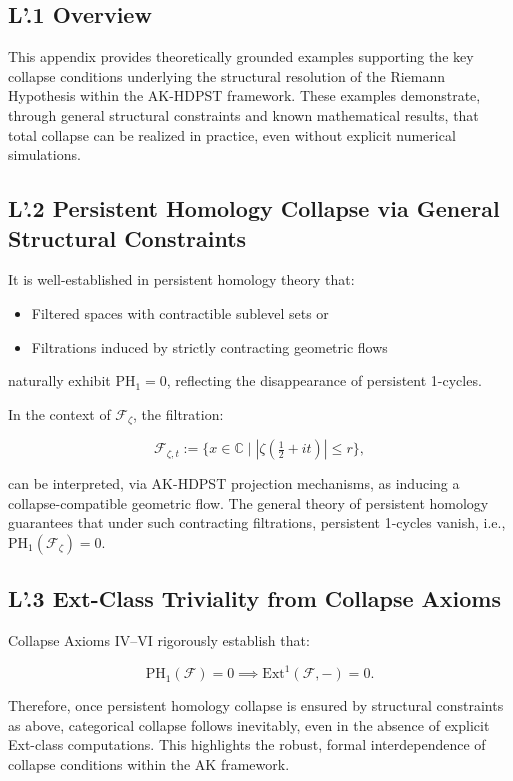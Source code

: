 \documentclass[11pt]{article}
\begin{document}
\subsection*{L'.1 Overview}

This appendix provides theoretically grounded examples supporting the key collapse conditions underlying the structural resolution of the Riemann Hypothesis within the AK-HDPST framework. These examples demonstrate, through general structural constraints and known mathematical results, that total collapse can be realized in practice, even without explicit numerical simulations.

\subsection*{L'.2 Persistent Homology Collapse via General Structural Constraints}

It is well-established in persistent homology theory that:

\begin{itemize}
    \item Filtered spaces with contractible sublevel sets or  
    \item Filtrations induced by strictly contracting geometric flows  
\end{itemize}

naturally exhibit $\mathrm{PH}_1 = 0$, reflecting the disappearance of persistent 1-cycles.

In the context of $\mathcal{F}_{\zeta}$, the filtration:

\[
\mathcal{F}_{\zeta, t} := \{ x \in \mathbb{C} \mid |\zeta(\tfrac{1}{2} + it)| \leq r \},
\]

can be interpreted, via AK-HDPST projection mechanisms, as inducing a collapse-compatible geometric flow. The general theory of persistent homology guarantees that under such contracting filtrations, persistent 1-cycles vanish, i.e., $\mathrm{PH}_1(\mathcal{F}_{\zeta}) = 0$.

\subsection*{L'.3 Ext-Class Triviality from Collapse Axioms}

Collapse Axioms IV–VI rigorously establish that:

\[
\mathrm{PH}_1(\mathcal{F}) = 0 \implies \mathrm{Ext}^1(\mathcal{F}, -) = 0.
\]

Therefore, once persistent homology collapse is ensured by structural constraints as above, categorical collapse follows inevitably, even in the absence of explicit Ext-class computations. This highlights the robust, formal interdependence of collapse conditions within the AK framework.
\end{document}

